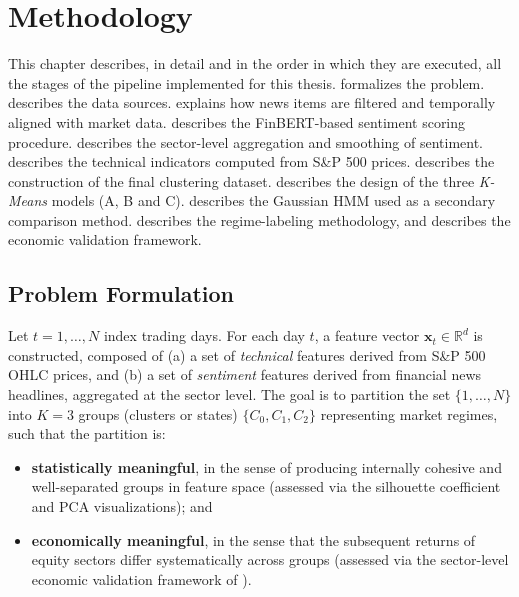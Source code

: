 \chapter{Methodology}
\label{ch:methodology}

This chapter describes, in detail and in the order in which they are
executed, all the stages of the pipeline implemented for this thesis.
 formalizes the problem. 
describes the data sources.  explains how news
items are filtered and temporally aligned with market data.
 describes the FinBERT-based sentiment scoring
procedure.  describes the sector-level
aggregation and smoothing of sentiment. 
describes the technical indicators computed from S\&P 500 prices.
 describes the construction of the final
clustering dataset.  describes the design of the
three \textit{K-Means} models (A, B and C).  describes
the Gaussian HMM used as a secondary comparison method.
 describes the regime-labeling methodology, and
 describes the economic validation framework.

\section{Problem Formulation}
\label{sec:meth-formulation}

Let $t = 1, \dots, N$ index trading days. For each day $t$, a feature
vector $\mathbf{x}_t \in \mathbb{R}^d$ is constructed, composed of (a) a
set of \emph{technical} features derived from S\&P 500 OHLC prices, and
(b) a set of \emph{sentiment} features derived from financial news
headlines, aggregated at the sector level. The goal is to partition the
set $\{1, \dots, N\}$ into $K=3$ groups (clusters or states)
$\{C_0, C_1, C_2\}$ representing market regimes, such that the partition
is:

\begin{itemize}
  \item \textbf{statistically meaningful}, in the sense of producing
  internally cohesive and well-separated groups in feature space (assessed
  via the silhouette coefficient and PCA visualizations); and
  \item \textbf{economically meaningful}, in the sense that the
  subsequent returns of equity sectors differ systematically across
  groups (assessed via the sector-level economic validation framework of
  ).
\end{itemize}

